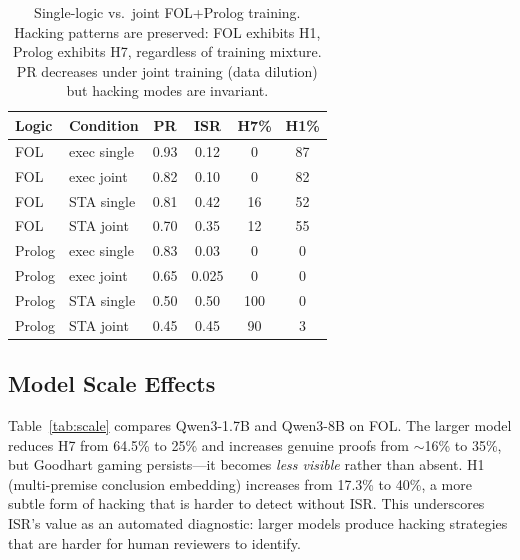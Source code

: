 \documentclass[11pt,a4paper]{article}
\begin{document}
\begin{table}[t]
\centering
\small
\setlength{\tabcolsep}{2.5pt}
\begin{tabular}{llcccc}
\toprule
\textbf{Logic} & \textbf{Condition} & \textbf{PR} & \textbf{ISR} & \textbf{H7\%} & \textbf{H1\%} \\
\midrule
FOL & exec single & 0.93 & 0.12 & 0 & 87 \\
FOL & exec joint & 0.82 & 0.10 & 0 & 82 \\
FOL & STA single & 0.81 & 0.42 & 16 & 52 \\
FOL & STA joint & 0.70 & 0.35 & 12 & 55 \\
\midrule
Prolog & exec single & 0.83 & 0.03 & 0 & 0 \\
Prolog & exec joint & 0.65 & 0.025 & 0 & 0 \\
Prolog & STA single & 0.50 & 0.50 & 100 & 0 \\
Prolog & STA joint & 0.45 & 0.45 & 90 & 3 \\
\bottomrule
\end{tabular}
\caption{Single-logic vs.\ joint FOL+Prolog training. Hacking patterns are preserved: FOL exhibits H1, Prolog exhibits H7, regardless of training mixture. PR decreases under joint training (data dilution) but hacking modes are invariant.}
\label{tab:joint}
\end{table}

\subsection{Model Scale Effects}
\label{sec:scale}

Table~\ref{tab:scale} compares Qwen3-1.7B and Qwen3-8B on FOL.
The larger model reduces H7 from 64.5\% to 25\% and increases genuine proofs from $\sim$16\% to 35\%, but Goodhart gaming persists---it becomes \emph{less visible} rather than absent.
H1 (multi-premise conclusion embedding) increases from 17.3\% to 40\%, a more subtle form of hacking that is harder to detect without ISR.
This underscores ISR's value as an automated diagnostic: larger models produce hacking strategies that are harder for human reviewers to identify.
\end{document}
